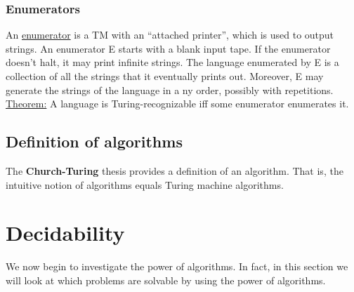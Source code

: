\documentclass[a4paper]{article}
\begin{document}
\subsubsection{Enumerators}
An \underline{enumerator} is a TM with an ``attached printer'', which is used to output strings. An enumerator E starts with a blank input tape. If the enumerator doesn't halt, it may print infinite strings. The language enumerated by E is a collection of all the strings that it eventually prints out. Moreover, E may generate the strings of the language in a ny order, possibly with repetitions. \\
\underline{Theorem:} A language is Turing-recognizable iff some  enumerator enumerates it.

\subsection{Definition of algorithms} %
\label{sub:Definition of algorithms}
The {\bf Church-Turing} thesis provides a definition of an algorithm. That is, the intuitive notion of algorithms equals Turing machine algorithms.
\section{Decidability} %
\label{sec:Decidibility}
We now begin to investigate the power of algorithms. In fact, in this section we will look at which problems are solvable by using the power of algorithms.
\end{document}
